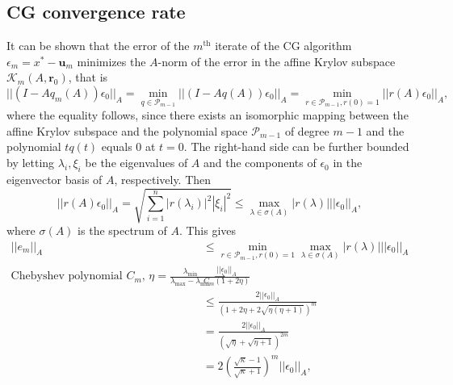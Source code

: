 \subsection{CG convergence rate}\label{sec:cg_convergence_rate}
It can be shown \cite[lemma 6.28 and theorem 6.29]{iter_method_saad} that the error of the $m^{\text{th}}$ iterate of the CG algorithm $\epsilon_m = x^* - \mathbf{u}_m$ minimizes the $A$-norm of the error in the affine Krylov subspace $\mathcal{K}_m(A, \mathbf{r}_0)$, that is
\begin{equation}
  ||(I - Aq_m(A))\epsilon_0||_A = \min_{q \in \mathcal{P}_{m-1}} ||(I - Aq(A))\epsilon_0||_A = \min_{r \in \mathcal{P}_{m-1}, r(0) = 1} ||r(A)\epsilon_0||_A,
  \label{eq:cg_convergence_rate}
\end{equation}
where the equality follows, since there exists an isomorphic mapping between the affine Krylov subspace and the polynomial space $\mathcal{P}_{m-1}$ of degree $m-1$ and the polynomial $tq(t)$ equals $0$ at $t=0$. The right-hand side can be further bounded by letting $\lambda_i, \xi_i$ be the eigenvalues of $A$ and the components of $\epsilon_0$ in the eigenvector basis of $A$, respectively. Then
\[
  ||r(A)\epsilon_0||_A = \sqrt{\sum_{i=1}^n |r(\lambda_i)|^2 |\xi_i|^2} \leq \max_{\lambda \in \sigma(A)} |r(\lambda)| ||\epsilon_0||_A,
\]
where $\sigma(A)$ is the spectrum of $A$. This gives
\begin{align*}
  ||e_m||_A                                                                                                                          &
  \leq \min_{r \in \mathcal{P}_{m-1}, r(0) = 1} \max_{\lambda \in \sigma(A)} |r(\lambda)| ||\epsilon_0||_A                                                                                                            \\
  \text{Chebyshev polynomial } C_m \text{, } \eta=\frac{\lambda_{\text{min}}}{\lambda_{\text{max}}-\lambda_{\text{min}}} \rightarrow & \frac{||\epsilon_0||_A}{C_m(1+2\eta)}                                          \\
                                                                                                                                     & \leq \frac{2||\epsilon_0||_A}{\left(1 + 2\eta + 2\sqrt{\eta(\eta+1)}\right)^m} \\
                                                                                                                                     & = \frac{2||\epsilon_0||_A}{\left(\sqrt{\eta} + \sqrt{\eta + 1}\right)^{2m}}    \\
                                                                                                                                     & = 2 \left(\frac{\sqrt{\kappa}-1}{\sqrt{\kappa} + 1}\right)^m ||\epsilon_0||_A,
\end{align*}
